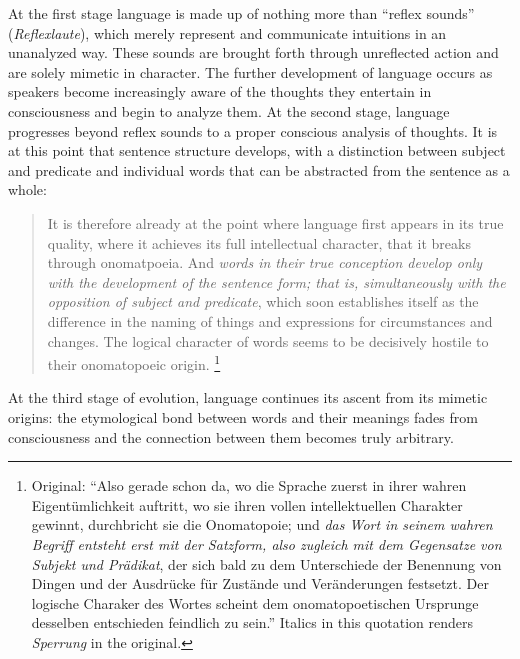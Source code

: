 \documentclass[output=paper]{langscibook}
\begin{document}
At the first stage language is made up of nothing more than ``reflex sounds'' (\emph{Reflexlaute}), which merely represent and communicate intuitions in an unanalyzed way. These sounds are brought forth through unreflected action and are solely mimetic in character. The further development of language occurs as speakers become increasingly aware of the thoughts they entertain in consciousness and begin to analyze them. At the second stage, language progresses beyond reflex sounds to a proper conscious analysis of thoughts. It is at this point that sentence structure develops, with a distinction between subject and predicate and individual words that can be abstracted from the sentence as a whole:

\begin{quotation}
It is therefore already at the point where language first appears in its true quality, where it achieves its full intellectual character, that it breaks through onomatpoeia. And \emph{words in their true conception develop only with the development of the sentence form; that is, simultaneously with the opposition of subject and predicate}, which soon establishes itself as the difference in the naming of things and expressions for circumstances and changes. The logical character of words seems to be decisively hostile to their onomatopoeic origin. \citep[424-425]{Steinthal1881}\footnote{Original: ``Also gerade schon da, wo die Sprache zuerst in ihrer wahren Eigentümlichkeit auftritt, wo sie ihren vollen intellektuellen Charakter gewinnt, durchbricht sie die Onomatopoie; und \emph{das Wort in seinem wahren Begriff entsteht erst mit der Satzform, also zugleich mit dem Gegensatze von Subjekt und Prädikat}, der sich bald zu dem Unterschiede der Benennung von Dingen und der Ausdrücke für Zustände und Veränderungen festsetzt. Der logische Charaker des Wortes scheint dem onomatopoetischen Ursprunge desselben entschieden feindlich zu sein.'' Italics in this quotation renders \emph{Sperrung} in the original.}
\end{quotation}

At the third stage of evolution, language continues its ascent from its mimetic origins: the etymological bond between words and their meanings fades from consciousness and the connection between them becomes truly arbitrary.
\end{document}
